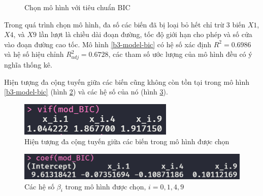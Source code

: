 \begin{figure}[H]
	\centering
	\hfill
	\caption{Chọn mô hình với tiêu chuẩn BIC}
	\label{fig-b3:model-bic}
\end{figure}

Trong quá trình chọn mô hình, đa số các biến đã bị loại bỏ hết chỉ trừ 3 biến $X1$, $X4$, và $X9$ lần lượt là chiều dài đoạn đường, tốc độ giới hạn cho phép và số cửa vào đoạn đường cao tốc. Mô hình \ref{b3-model-bic} có hệ số xác định $R^2 = 0.6986$ và hệ số hiệu chỉnh $R^2_{adj} = 0.6728$, các tham số ước lượng của mô hình đều có ý nghĩa thống kê. 

Hiện tượng đa cộng tuyến giữa các biến cũng không còn tồn tại trong mô hình \ref{b3-model-bic} (hình \ref{fig-b3:model-bic-vif}) và các hệ số của nó (hình \ref{fig-b3:model-bic-coef}).
\begin{figure}[H]
	\centering
	\includegraphics[width=0.35\linewidth]{images/B3/model-bic-vif}
	\caption{Hiện tượng đa cộng tuyến giữa các biến trong mô hình được chọn}
	\label{fig-b3:model-bic-vif}
\end{figure}

\begin{figure}[H]
	\centering
	\includegraphics[width=0.6\linewidth]{images/B3/model-bic-coef}
	\caption{Các hệ số $\beta_i$ trong mô hình được chọn, $i=0,1,4,9$}
	\label{fig-b3:model-bic-coef}
\end{figure}


